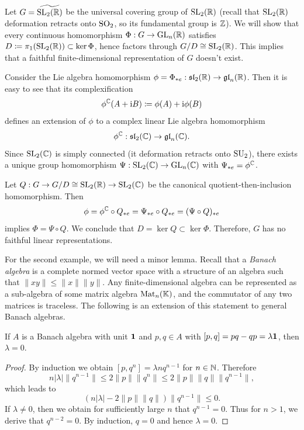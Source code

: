 \begin{example}\label{ex SL2R nonlinear}
    Let $G=\widetilde{\SL_2(\bbR)}$ be the universal covering group of $\SL_2(\bbR)$ (recall that $\SL_2(\bbR)$ deformation retracts onto $\SO_2$, so its fundamental group is $\bbZ$). We will show that every continuous homomorphism $\Phi:G\to \GL_n(\bbR)$ satisfies $D\coloneqq \pi_1(\SL_2(\bbR))\subset \ker\Phi$, hence factors through $G\slash D\cong \SL_2(\bbR)$. This implies that a faithful finite-dimensional representation of $G$ doesn't exist.

    Consider the Lie algebra homomorphism $\phi=\Phi_{\ast e}:\fraksl_2(\bbR)\to \frakgl_n(\bbR)$. Then it is easy to see that its complexification 
    \[\phi^\bbC (A+\i B)\coloneqq \phi(A)+\i \phi(B)\]
    defines an extension of $\phi$ to a complex linear Lie algebra homomorphism 
    \[\phi^\bbC:\fraksl_2(\bbC)\to \frakgl_n(\bbC).\]
    Since $\SL_2(\bbC)$ is simply connected (it deformation retracts onto $\SU_2$), there exists a unique group homomorphism $\Psi:\SL_2(\bbC)\to \GL_n(\bbC)$ with $\Psi_{\ast e}=\phi^\bbC$. 

    Let $Q:G\to G\slash D\cong \SL_2(\bbR)\to \SL_2(\bbC)$ be the canonical quotient-then-inclusion homomorphism. Then 
    \[\phi=\phi^\bbC\circ Q_{\ast e}=\Psi_{\ast e}\circ Q_{\ast e}=(\Psi\circ Q)_{\ast e}\]
    implies $\Phi=\Psi\circ Q$. We conclude that $D=\ker Q\subset \ker\Phi$. Therefore, $G$ has no faithful linear representations.
\end{example}


For the second example, we will need a minor lemma. Recall that a \emph{Banach algebra} is a complete normed vector space with a structure of an algebra such that $\lVert xy\rVert\leq \lVert x\rVert \lVert y\rVert$. Any finite-dimensional algebra can be represented as a sub-algebra of some matrix algebra $\Mat_n(\bbK)$, and the commutator of any two matrices is traceless. The following is an extension of this statement to general Banach algebras.

\begin{lem}
    If $A$ is a Banach algebra with unit $\bf{1}$ and $p,q\in A$ with $[p,q]=pq-qp=\lambda \bf{1}$, then $\lambda=0$.
\end{lem}
\begin{proof}
    By induction we obtain $[p,q^n]=\lambda nq^{n-1}$ for $n\in\bbN$. Therefore
    \[n|\lambda|\lVert q^{n-1}\rVert\leq 2\lVert p\rVert \lVert q^n\rVert\leq 2\lVert p\rVert \lVert q\rVert \lVert q^{n-1}\rVert,\]
    which leads to
    \[\left(n|\lambda|-2\lVert p\rVert \lVert q\rVert\right)\lVert q^{n-1}\rVert \leq 0.\]
    If $\lambda\neq 0$, then we obtain for sufficiently large $n$ that $q^{n-1}=0$. Thus for $n>1$, we derive that $q^{n-2}=0$. By induction, $q=0$ and hence $\lambda=0$.
\end{proof}


